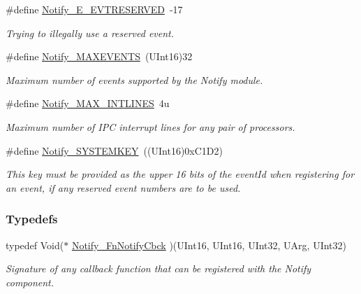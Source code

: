\begin{DoxyCompactItemize}
\#define \hyperlink{_notify_8h_a68460eb33839572c7416387b91e33e68}{Notify\_\-E\_\-EVTRESERVED}~-\/17
\begin{DoxyCompactList}\small\item\em Trying to illegally use a reserved event. \item\end{DoxyCompactList}\item 
\#define \hyperlink{_notify_8h_afb698e2a48abcb1b698e80a16b38bf43}{Notify\_\-MAXEVENTS}~(UInt16)32
\begin{DoxyCompactList}\small\item\em Maximum number of events supported by the Notify module. \item\end{DoxyCompactList}\item 
\#define \hyperlink{_notify_8h_a67e0ce1661274a428248b143dd41dbfc}{Notify\_\-MAX\_\-INTLINES}~4u
\begin{DoxyCompactList}\small\item\em Maximum number of IPC interrupt lines for any pair of processors. \item\end{DoxyCompactList}\item 
\#define \hyperlink{_notify_8h_ac33600d8704857ef0afbbee3d4ce6d80}{Notify\_\-SYSTEMKEY}~((UInt16)0xC1D2)
\begin{DoxyCompactList}\small\item\em This key must be provided as the upper 16 bits of the eventId when registering for an event, if any reserved event numbers are to be used. \item\end{DoxyCompactList}\end{DoxyCompactItemize}
\subsubsection*{Typedefs}
\begin{DoxyCompactItemize}
\item 
typedef Void($\ast$ \hyperlink{_notify_8h_ab362f7571ee3d7f7abaa743914edcd62}{Notify\_\-FnNotifyCbck} )(UInt16, UInt16, UInt32, UArg, UInt32)
\begin{DoxyCompactList}\small\item\em Signature of any callback function that can be registered with the Notify component. \item\end{DoxyCompactList}\end{DoxyCompactItemize}
